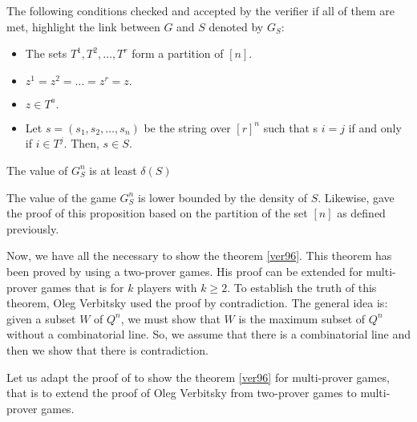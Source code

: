 The following conditions checked and accepted  by the verifier  if all of them are met, highlight  the link between $G$ and $S$ denoted by $G_S$:
\begin{itemize}
\item The sets $T^1, T^2,\ldots, T^r$ form a partition of $[n].$
\item $z^1=z^2=\ldots=z^r=z.$
\item $z \in T^a.$
\item Let $s = (s_1, s_2, \ldots, s_n)$ be the string over $[r]^n$ such that s $i = j$ if and only if $i \in  T ^j.$ Then, $s \in S.$
\end{itemize}


\begin{pro}	 The value of $G_S^n$ is at least $\delta(S)$	\end{pro}

The value of the game $G_S^n$ is lower bounded by the density of $S.$ Likewise, \cite{hkazla2016forbidden} gave the proof of this proposition based on the partition of the set $[n]$ as defined previously.

Now, we have all the necessary to show the theorem \eqref{ver96}. This theorem  has been proved by \cite{verbitsky1996towards} using a two-prover games.  His proof can be extended for  multi-prover games that is for $k$ players with $k\geq 2.$ To establish the truth of  this theorem, Oleg Verbitsky used the proof by contradiction. The general idea is: given a subset $W$ of $Q^n$, we must show that $W$ is  the maximum subset of $Q^n$ without a combinatorial line.
So, we assume that there is a combinatorial line and then we show that there is  contradiction.

Let us adapt the proof of  \cite{verbitsky1996towards} to show the theorem \eqref{ver96} for multi-prover games, that is to extend the proof of Oleg Verbitsky from two-prover games to multi-prover games.

